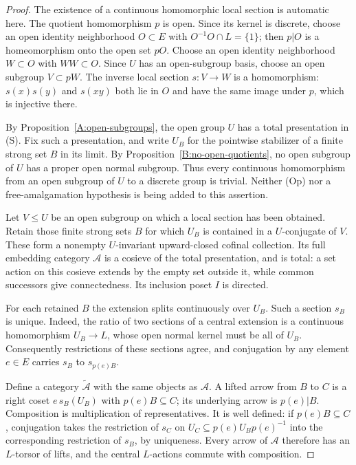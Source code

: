 \begin{proof}
The existence of a continuous homomorphic local section is
automatic here. The quotient homomorphism $p$ is open. Since
its kernel is discrete, choose an open identity neighborhood
$O\subset E$ with $O^{-1}O\cap L=\{1\}$; then $p|O$ is a
homeomorphism onto the open set $pO$. Choose an open identity
neighborhood $W\subset O$ with $WW\subset O$. Since $U$ has
an open-subgroup basis, choose an open subgroup $V\subset pW$.
The inverse local section $s:V\to W$ is a homomorphism:
$s(x)s(y)$ and $s(xy)$ both lie in $O$ and have the same image
under $p$, which is injective there.

By Proposition~\ref{A:open-subgroups}, the open group $U$
has a total presentation in \textup{(S)}. Fix such a
presentation, and write $U_B$ for the pointwise stabilizer
of a finite strong set $B$ in its limit. By
Proposition~\ref{B:no-open-quotients}, no open subgroup of $U$
has a proper open normal subgroup. Thus every continuous
homomorphism from an open subgroup of $U$ to a discrete group
is trivial. Neither (Op) nor a free-amalgamation hypothesis
is being added to this assertion.

Let $V\leq U$ be an open subgroup on which a local section
has been obtained. Retain those finite strong sets $B$ for
which $U_B$ is contained in a $U$-conjugate of $V$.
These form a nonempty $U$-invariant upward-closed cofinal
collection. Its full embedding category $\mathcal A$ is a
cosieve of the total presentation, and is total: a set action
on this cosieve extends by the empty set outside it, while
common successors give connectedness. Its inclusion poset
$I$ is directed.

For each retained $B$ the extension splits continuously over
$U_B$. Such a section $s_B$ is unique. Indeed, the ratio of two
sections of a central extension is a continuous homomorphism
$U_B\to L$, whose open normal kernel must be all of $U_B$.
Consequently restrictions of these sections agree, and conjugation
by any element $e\in E$ carries $s_B$ to $s_{p(e)B}$.

Define a category $\widetilde{\mathcal A}$ with the same objects
as $\mathcal A$. A lifted arrow from $B$ to $C$ is a right coset
$e\,s_B(U_B)$ with $p(e)B\subseteq C$; its underlying arrow is
$p(e)|B$. Composition is multiplication of representatives.
It is well defined: if $p(e)B\subseteq C$, conjugation takes the
restriction of $s_C$ on $U_C\subseteq p(e)U_Bp(e)^{-1}$ into the
corresponding restriction of $s_B$, by uniqueness. Every arrow
of $\mathcal A$ therefore has an $L$-torsor of lifts, and the
central $L$-actions commute with composition.


\end{proof}
